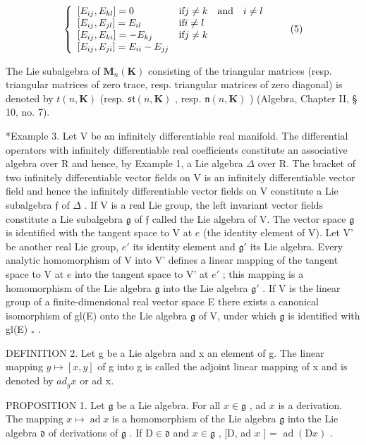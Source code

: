 \[
\left\{ \begin{array}{l l} [ E _ {i j}, E _ {k l} ] = 0 & \text {if} j \neq k \quad \text {and} \quad i \neq l \\ {} [ E _ {i j}, E _ {j l} ] = E _ {i l} & \text {if} i \neq l \\ {} [ E _ {i j}, E _ {k i} ] = - E _ {k j} & \text {if} j \neq k \\ {} [ E _ {i j}, E _ {j i} ] = E _ {i i} - E _ {j j} \end{array} \right.\tag{5}
\]

The Lie subalgebra of \(\mathbf{M}_{n}(\mathbf{K})\) consisting of the triangular matrices (resp. triangular matrices of zero trace, resp. triangular matrices of zero diagonal) is denoted by \(t(n,\mathbf{K})\) (resp. \(\mathfrak{st}(n,\mathbf{K})\) , resp. \(\mathfrak{n}(n,\mathbf{K})\) ) (Algebra, Chapter II, § 10, no. 7).

*Example 3. Let V be an infinitely differentiable real manifold. The differential operators with infinitely differentiable real coefficients constitute an associative algebra over R and hence, by Example 1, a Lie algebra \(\Delta\) over R. The bracket of two infinitely differentiable vector fields on V is an infinitely differentiable vector field and hence the infinitely differentiable vector fields on V constitute a Lie subalgebra \(\mathfrak{f}\) of \(\Delta\) . If V is a real Lie group, the left invariant vector fields constitute a Lie subalgebra \(\mathfrak{g}\) of \(\mathfrak{f}\) called the Lie algebra of V. The vector space \(\mathfrak{g}\) is identified with the tangent space to V at \(e\) (the identity element of V). Let V' be another real Lie group, \(e'\) its identity element and \(\mathfrak{g}'\) its Lie algebra. Every analytic homomorphism of V into V' defines a linear mapping of the tangent space to V at \(e\) into the tangent space to V' at \(e'\) ; this mapping is a homomorphism of the Lie algebra \(\mathfrak{g}\) into the Lie algebra \(\mathfrak{g}'\) . If V is the linear group of a finite-dimensional real vector space E there exists a canonical isomorphism of gl(E) onto the Lie algebra \(\mathfrak{g}\) of V, under which \(\mathfrak{g}\) is identified with gl(E) \(_*\) .

DEFINITION 2. Let g be a Lie algebra and x an element of g. The linear mapping \(y \mapsto [x, y]\) of g into g is called the adjoint linear mapping of x and is denoted by \(ad_{g}x\) or ad x.

PROPOSITION 1. Let \(\mathfrak{g}\) be a Lie algebra. For all \(x \in \mathfrak{g}\) , ad \(x\) is a derivation. The mapping \(x \mapsto \operatorname{ad} x\) is a homomorphism of the Lie algebra \(\mathfrak{g}\) into the Lie algebra \(\mathfrak{d}\) of derivations of \(\mathfrak{g}\) . If \(\mathrm{D} \in \mathfrak{d}\) and \(x \in \mathfrak{g}\) , {[}D, ad \(x\) {]} = \(\operatorname{ad}(\mathrm{D}x)\) .

